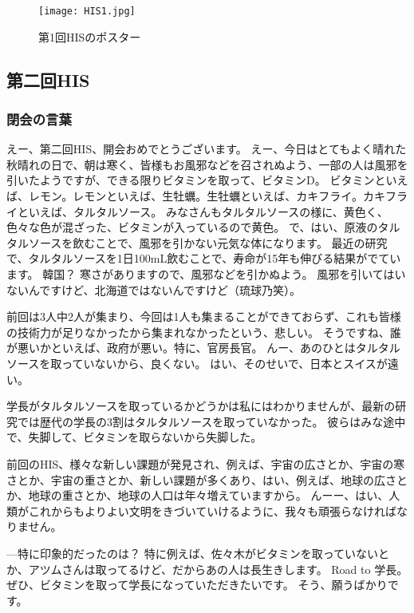 
\begin{figure}[H]
\centering
\texttt{[image: HIS1.jpg]}
\caption{第1回HISのポスター}
\label{HIS1}
\end{figure}

\subsection{第二回HIS}
\subsubsection{閉会の言葉}
えー、第二回HIS、開会おめでとうございます。
えー、今日はとてもよく晴れた秋晴れの日で、朝は寒く、皆様もお風邪などを召されぬよう、一部の人は風邪を引いたようですが、できる限りビタミンを取って、ビタミンD。
ビタミンといえば、レモン。レモンといえば、生牡蠣。生牡蠣といえば、カキフライ。カキフライといえば、タルタルソース。
みなさんもタルタルソースの様に、黄色く、色々な色が混ざった、ビタミンが入っているので黄色。
で、はい、原液のタルタルソースを飲むことで、風邪を引かない元気な体になります。
最近の研究で、タルタルソースを1日100mL飲むことで、寿命が15年も伸びる結果がでています。
韓国？
寒さがありますので、風邪などを引かぬよう。
風邪を引いてはいないんですけど、北海道ではないんですけど（琉球乃笑）。

前回は3人中2人が集まり、今回は1人も集まることができておらず、これも皆様の技術力が足りなかったから集まれなかったという、悲しい。
そうですね、誰が悪いかといえば、政府が悪い。特に、官房長官。
んー、あのひとはタルタルソースを取っていないから、良くない。
はい、そのせいで、日本とスイスが遠い。

学長がタルタルソースを取っているかどうかは私にはわかりませんが、最新の研究では歴代の学長の3割はタルタルソースを取っていなかった。
彼らはみな途中で、失脚して、ビタミンを取らないから失脚した。

前回のHIS、様々な新しい課題が発見され、例えば、宇宙の広さとか、宇宙の寒さとか、宇宙の重さとか、新しい課題が多くあり、はい、例えば、地球の広さとか、地球の重さとか、地球の人口は年々増えていますから。
んーー、はい、人類がこれからもよりよい文明をきづいていけるように、我々も頑張らなければなりません。

—特に印象的だったのは？
特に例えば、佐々木がビタミンを取っていないとか、アツムさんは取ってるけど、だからあの人は長生きします。
Road to 学長。
ぜひ、ビタミンを取って学長になっていただきたいです。
そう、願うばかりです。

